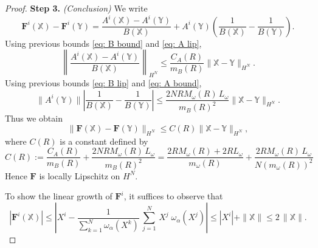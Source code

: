 \documentclass[10pt,a4paper]{amsart}
\begin{document}
\begin{proof}
\textbf{Step 3.} \textit{(Conclusion)} 
We write
\begin{equation*}
    \mathbf{F}^i(\mathds{X}) - \mathbf{F}^i(\mathds{Y}) = \frac{A^i(\mathds{X}) - A^i(\mathds{Y})}{B(\mathds{X})} + A^i(\mathds{Y}) \left( \frac{1}{B(\mathds{X})} - \frac{1}{B(\mathds{Y})} \right).
\end{equation*}
\textbullet\; Using previous bounds \eqref{eq: B bound} and \eqref{eq: A lip},
\begin{equation*}
    \left\|\frac{A^i(\mathds{X}) - A^i(\mathds{Y})}{B(\mathds{X})}\right\|_{H^N} \le \frac{C_A(R)}{m_B(R)} \|\mathds{X} - \mathds{Y}\|_{H^N}.
\end{equation*}
\textbullet\; Using previous bounds \eqref{eq: B lip} and \eqref{eq: A bound},
\begin{equation*}
    \|A^i(\mathds{Y})\| \left|\frac{1}{B(\mathds{X})} - \frac{1}{B(\mathds{Y})}\right| \le \frac{2N R M_\omega(R)\, L_\omega}{m_B(R)^2} \|\mathds{X} - \mathds{Y}\|_{H^N}.
\end{equation*}
Thus we obtain
\begin{equation*}
    \|\mathbf{F}(\mathds{X}) - \mathbf{F}(\mathds{Y})\|_{H^N} \le C(R)\|\mathds{X} - \mathds{Y}\|_{H^N},
\end{equation*}
where $C(R)$ is a constant defined by
\begin{equation*}
    C(R) := \frac{C_A(R)}{m_B(R)} + \frac{2N R M_\omega(R)\, L_\omega}{m_B(R)^2} =  \frac{2R M_\omega(R) + 2R L_\omega}{m_\omega(R)} + \frac{2 R M_\omega(R)\, L_\omega}{N(m_\omega(R))^2}
\end{equation*}
Hence $\mathbf{F}$ is locally Lipschitz on $H^N$.

To show the linear growth of $\mathbf{F}^{i}$, it suffices to observe that
\begin{equation*}
    |\mathbf{F}^{i}(\mathds{X})| \leq \left|  X^{i} - \frac{1}{\sum\limits_{k=1}^{N}\omega_{\alpha}(X^{k})} \, \sum\limits_{j=1}^{N}\,X^{j}\; \omega_{\alpha}(X^{j})  \right| \leq |X^{i}| + \|\mathds{X}\|\leq 2\,\|\mathds{X}\|.
\end{equation*}
\end{proof}
\end{document}
